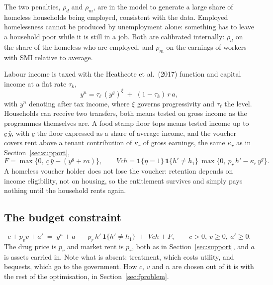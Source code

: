 \documentclass[10pt]{article}
\begin{document}
The two penalties, $\rho_d$ and $\rho_m$, are in the model to generate a
large share of homeless households being employed, consistent with the data.
Employed homelessness cannot be produced by unemployment alone:
something has to leave a household poor while it is still in a job.
Both are calibrated internally: $\rho_d$ on the share of the homeless who
are employed, and $\rho_m$ on the earnings of workers with SMI relative to
average.

Labour income is taxed with the Heathcote et al.\ (2017) function and
capital income at a flat rate $\tau_k$,
\begin{equation}\label{eq:ftax}
y^{n}=\tau_{\ell}\,(y^{g})^{\xi}\;+\;(1-\tau_k)\,r\,a ,
\end{equation}
with $y^{n}$ denoting after tax income, where $\xi$ governs progressivity
and $\tau_{\ell}$ the level. Households can
receive two transfers, both means tested on gross income as the programmes
themselves are. A food stamp floor tops means
tested income up to $\underline c\,\bar y$, with $\underline c$ the floor
expressed as a share of average income, and the voucher covers rent above a
tenant contribution of $\kappa_r$ of gross earnings, the same $\kappa_r$ as
in Section~\ref{sec:support},
\begin{equation}\label{eq:ftrans}
F=\max\big\{0,\ \underline c\,\bar y-(y^{g}+ra)\big\},
\qquad
V\!ch=\mathbf{1}\{\eta=1\}\,\mathbf{1}\{h'\neq h_1\}\,
\max\big\{0,\ p_r\, h'-\kappa_r\,y^{g}\big\}.
\end{equation}
A homeless voucher holder does not lose the voucher: retention depends on income
eligibility, not on housing, so the entitlement survives and simply pays nothing
until the household rents again.

\subsection{The budget constraint}

\begin{equation}\label{eq:fbudget}
c+p_v v+a' \;=\; y^{n}+a\;-\;p_r\, h'\,\mathbf{1}\{h'\neq h_1\}\;+\;V\!ch+F,
\qquad c>0,\ v\ge0,\ a'\ge0 .
\end{equation}
The drug price is $p_v$ and market rent is $p_r$, both as in
Section~\ref{sec:support}, and $a$ is assets carried in. Note what is absent:
treatment, which costs utility, and bequests, which go to the government.
How $c$, $v$ and $n$ are chosen out of it is with the rest of the
optimisation, in Section~\ref{sec:fproblem}.
\end{document}
